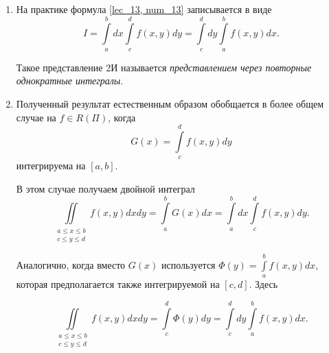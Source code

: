 \documentclass[../../main.tex]{subfiles}
\begin{document}
\begin{rems} 
	
	\quad
	
	\begin{enumerate}
		\item  На практике формула 
		\eqref {lec_13, num_13} записывается в виде 
		\[ I = \int\limits_a^b dx \int\limits_c^d f \left( x, y \right) dy = 
		\int\limits_c^d dy \int\limits_a^b f \left( x, y \right) dx. \]
		
		Такое представление 2И называется 
		\emph{представлением через 
		повторные однократные интегралы}.
		
		\item Полученный результат естественным образом обобщается в более
		общем случае на $ f \in R(\Pi)$, когда
		\[
		G \left( x \right) = \int\limits_c^d f \left( x, y \right) dy
		\]
		интегрируема на $ \left[ a, b \right] $.
		
		В этом случае получаем двойной интеграл
		\begin{equation}
		\label{lec_13, num_17}
		\underset{\substack{
				a \leq x \leq b \\
				c \leq y \leq d
		}}{\iint} f \left( x, y \right) dx dy = 
		\int\limits_a^b G \left( x \right) dx  =
		\int\limits_a^b dx \int\limits_c^d f \left( x, y \right) dy.
		\end{equation}
		
		Аналогично, когда вместо $ G \left( x \right) $ используется
		$\Phi\left( y \right) = \int\limits_a^b f \left( x, y \right) dx $, 
		которая предполагается также интегрируемой на 
		$ \left[ c, d \right]  $. Здесь
		
		\begin{equation}
		\label{lec_13, num_18}
		\underset{\substack{
				a \leq x \leq b \\
				c \leq y \leq d
		}}{\iint} f \left( x, y \right) dx dy = 
		\int\limits_c^d \Phi \left( y \right) dy  =
		\int\limits_c^d dy \int\limits_a^b f \left( x, y \right) dx.
		\end{equation}
		
	\end{enumerate}
	
\end{rems}
\end{document}

